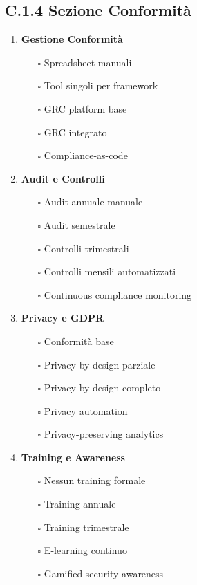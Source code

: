 \subsection{C.1.4 Sezione Conformità}

\begin{enumerate}
\item \textbf{Gestione Conformità}
   \begin{itemize}
   \item[$\square$] Spreadsheet manuali
   \item[$\square$] Tool singoli per framework
   \item[$\square$] GRC platform base
   \item[$\square$] GRC integrato
   \item[$\square$] Compliance-as-code
   \end{itemize}

\item \textbf{Audit e Controlli}
   \begin{itemize}
   \item[$\square$] Audit annuale manuale
   \item[$\square$] Audit semestrale
   \item[$\square$] Controlli trimestrali
   \item[$\square$] Controlli mensili automatizzati
   \item[$\square$] Continuous compliance monitoring
   \end{itemize}

\item \textbf{Privacy e GDPR}
   \begin{itemize}
   \item[$\square$] Conformità base
   \item[$\square$] Privacy by design parziale
   \item[$\square$] Privacy by design completo
   \item[$\square$] Privacy automation
   \item[$\square$] Privacy-preserving analytics
   \end{itemize}

\item \textbf{Training e Awareness}
   \begin{itemize}
   \item[$\square$] Nessun training formale
   \item[$\square$] Training annuale
   \item[$\square$] Training trimestrale
   \item[$\square$] E-learning continuo
   \item[$\square$] Gamified security awareness
   \end{itemize}
\end{enumerate}

